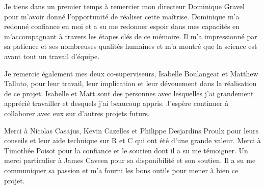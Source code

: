 

\Pagetitre
\cleardoublepage






\remerciements


Je tiens dans un premier temps à remercier mon directeur Dominique Gravel pour m'avoir donné
l'opportunité de réaliser cette maîtrise. Dominique m'a redonné confiance en moi et a su me redonner
espoir dans mes capacités en m'accompagnant à travers les étapes clés de ce mémoire. Il m'a impressionné par sa patience et ses nombreuses qualités humaines et m'a montré
que la science est avant tout un travail d'équipe.

Je remercie également mes deux co-superviseurs, Isabelle Boulangeat et Matthew Talluto, pour leur
travail, leur implication et leur dévouement dans la réalisation de ce projet. Isabelle et Matt sont
des personnes avec lesquelles j'ai grandement apprécié travailler et desquels j'ai beaucoup appris. J'espère continuer à collaborer avec eux sur d'autres projets futurs.

Merci à Nicolas Casajus, Kevin Cazelles et Philippe Desjardins Proulx pour leurs conseils et leur aide
technique sur R et C qui ont été d'une grande valeur. Merci à Timothée Poisot pour la confiance et
le soutien dont il a su me témoigner. Un merci particulier à James Caveen pour sa
disponibilité et son soutien. Il a su me communiquer sa passion et m'a fourni les bons outils pour
mener à bien ce projet.

